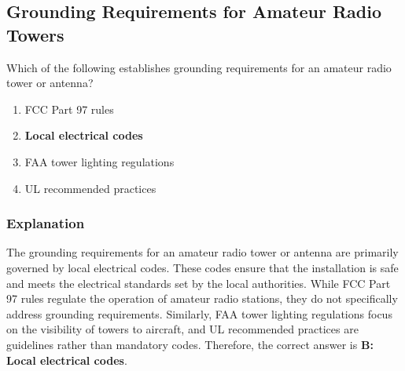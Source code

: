 \subsection{Grounding Requirements for Amateur Radio Towers}
\label{T0B11}

\begin{tcolorbox}[colback=gray!10!white,colframe=black!75!black,title=T0B11]
Which of the following establishes grounding requirements for an amateur radio tower or antenna?
\begin{enumerate}[noitemsep]
    \item FCC Part 97 rules
    \item \textbf{Local electrical codes}
    \item FAA tower lighting regulations
    \item UL recommended practices
\end{enumerate}
\end{tcolorbox}

\subsubsection*{Explanation}
The grounding requirements for an amateur radio tower or antenna are primarily governed by local electrical codes. These codes ensure that the installation is safe and meets the electrical standards set by the local authorities. While FCC Part 97 rules regulate the operation of amateur radio stations, they do not specifically address grounding requirements. Similarly, FAA tower lighting regulations focus on the visibility of towers to aircraft, and UL recommended practices are guidelines rather than mandatory codes. Therefore, the correct answer is \textbf{B: Local electrical codes}.